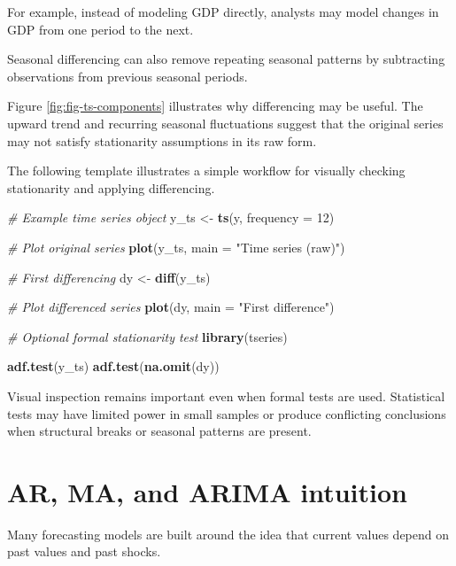 \documentclass[
  11pt,
  oneside]{book}
\newenvironment{Shaded}{\begin{snugshade}}{\end{snugshade}}
\newcommand{\AttributeTok}[1]{\textcolor[rgb]{0.13,0.29,0.53}{#1}}
\newcommand{\CommentTok}[1]{\textcolor[rgb]{0.56,0.35,0.01}{\textit{#1}}}
\newcommand{\DecValTok}[1]{\textcolor[rgb]{0.00,0.00,0.81}{#1}}
\newcommand{\FunctionTok}[1]{\textcolor[rgb]{0.13,0.29,0.53}{\textbf{#1}}}
\newcommand{\NormalTok}[1]{#1}
\newcommand{\OtherTok}[1]{\textcolor[rgb]{0.56,0.35,0.01}{#1}}
\newcommand{\StringTok}[1]{\textcolor[rgb]{0.31,0.60,0.02}{#1}}
\begin{document}
For example, instead of modeling GDP directly, analysts may model changes in GDP from one period to the next.

Seasonal differencing can also remove repeating seasonal patterns by subtracting observations from previous seasonal periods.

Figure \ref{fig:fig-ts-components} illustrates why differencing may be useful. The upward trend and recurring seasonal fluctuations suggest that the original series may not satisfy stationarity assumptions in its raw form.

The following template illustrates a simple workflow for visually checking stationarity and applying differencing.

\begin{Shaded}
\begin{Highlighting}[]
\CommentTok{\# Example time series object}
\NormalTok{y\_ts }\OtherTok{\textless{}{-}} \FunctionTok{ts}\NormalTok{(y, }\AttributeTok{frequency =} \DecValTok{12}\NormalTok{)}

\CommentTok{\# Plot original series}
\FunctionTok{plot}\NormalTok{(y\_ts, }\AttributeTok{main =} \StringTok{"Time series (raw)"}\NormalTok{)}

\CommentTok{\# First differencing}
\NormalTok{dy }\OtherTok{\textless{}{-}} \FunctionTok{diff}\NormalTok{(y\_ts)}

\CommentTok{\# Plot differenced series}
\FunctionTok{plot}\NormalTok{(dy, }\AttributeTok{main =} \StringTok{"First difference"}\NormalTok{)}

\CommentTok{\# Optional formal stationarity test}
\FunctionTok{library}\NormalTok{(tseries)}

\FunctionTok{adf.test}\NormalTok{(y\_ts)}
\FunctionTok{adf.test}\NormalTok{(}\FunctionTok{na.omit}\NormalTok{(dy))}
\end{Highlighting}
\end{Shaded}

Visual inspection remains important even when formal tests are used. Statistical tests may have limited power in small samples or produce conflicting conclusions when structural breaks or seasonal patterns are present.

\section{AR, MA, and ARIMA intuition}\label{ar-ma-and-arima-intuition}

Many forecasting models are built around the idea that current values depend on past values and past shocks.
\end{document}
